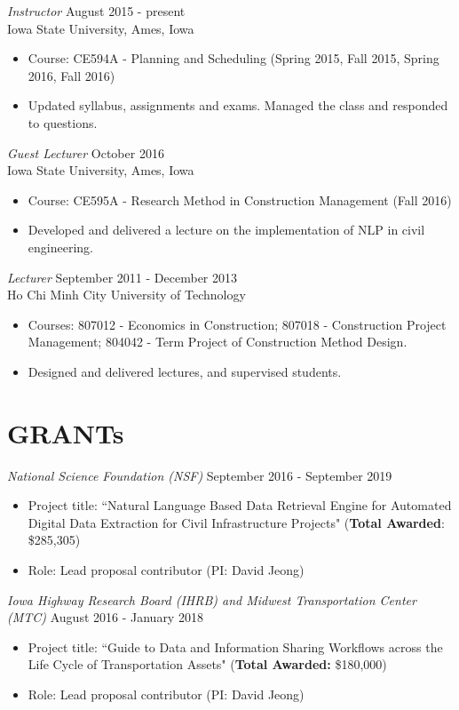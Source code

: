 \documentclass[11pt]{article}
\begin{document}
{\sl Instructor} \hfill August 2015 - present \\
Iowa State University, Ames, Iowa
\begin{itemize}
\item Course: CE594A - Planning and Scheduling (Spring 2015, Fall 2015, Spring 2016, Fall 2016)
\item Updated syllabus, assignments and exams. Managed the class and responded to questions.
\end{itemize}

{\sl Guest Lecturer} \hfill October 2016 \\
Iowa State University, Ames, Iowa
\begin{itemize}
\item Course: CE595A - Research Method in Construction Management (Fall 2016) 
\item Developed and delivered a lecture on the implementation of NLP in civil engineering.
\end{itemize}

{\sl Lecturer} \hfill September 2011 - December 2013 \\
Ho Chi Minh City University of Technology
\begin{itemize}
\item Courses: 807012 - Economics in Construction; 807018 - Construction Project Management; 804042 - Term Project of Construction Method Design.
\item Designed and delivered lectures, and supervised students. 
\end{itemize} 
\section*{GRANTs}

{\sl National Science Foundation (NSF)} \hfill September 2016 - September 2019 
\begin{itemize}
\item Project title: ``Natural Language Based Data Retrieval Engine for Automated Digital Data Extraction for Civil Infrastructure Projects" ({\bf Total Awarded}: \$285,305)
\item Role: Lead proposal contributor (PI: David Jeong)
\end{itemize} 

{\sl Iowa Highway Research Board (IHRB) and Midwest Transportation Center (MTC)} \hfill August 2016 - January 2018
\begin{itemize}
\item Project title: ``Guide to Data and Information Sharing Workflows across the Life Cycle of Transportation Assets" ({\bf Total Awarded:} \$180,000)
\item Role: Lead proposal contributor (PI: David Jeong)
\end{itemize} 
\end{document}
